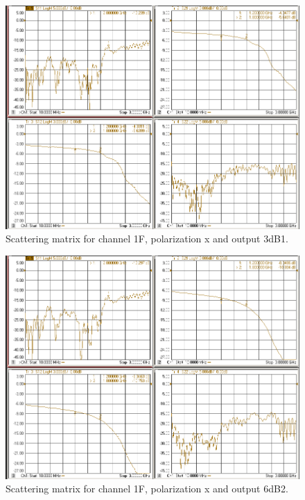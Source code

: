 \documentclass[12pt,a4paper,oneside]{article}
\begin{document}
\begin{figure}[H]
\centering
\includegraphics[width=0.9\linewidth]{VNA_results/1Fx_3dB1.png}
\caption{Scattering matrix for channel 1F, polarization x and output 3dB1.}
\label{fig:1Fx_3dB1}
\end{figure}


\begin{figure}[H]
\centering
\includegraphics[width=0.9\linewidth]{VNA_results/1Fx_6dB2.png}
\caption{Scattering matrix for channel 1F, polarization x and output 6dB2.}
\label{fig:1Fx_6dB2}
\end{figure}
\end{document}
